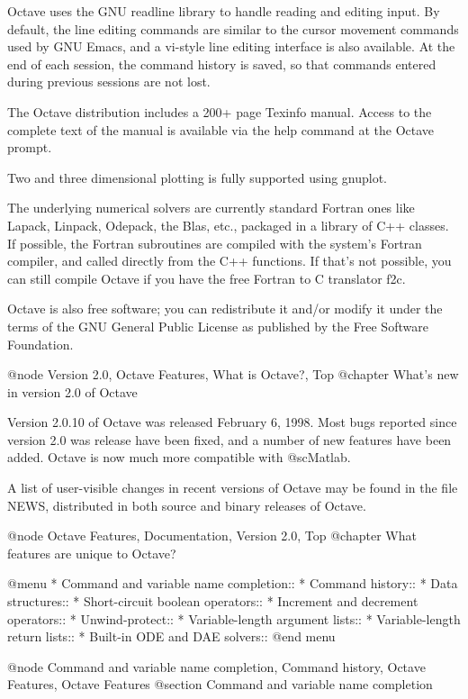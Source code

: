 Octave uses the GNU readline library to handle reading and editing
input.  By default, the line editing commands are similar to the
cursor movement commands used by GNU Emacs, and a vi-style line
editing interface is also available.  At the end of each session, the
command history is saved, so that commands entered during previous
sessions are not lost.

The Octave distribution includes a 200+ page Texinfo manual.  Access
to the complete text of the manual is available via the help command
at the Octave prompt.

Two and three dimensional plotting is fully supported using gnuplot.

The underlying numerical solvers are currently standard Fortran ones
like Lapack, Linpack, Odepack, the Blas, etc., packaged in a library
of C++ classes.  If possible, the Fortran subroutines are compiled
with the system's Fortran compiler, and called directly from the C++
functions.  If that's not possible, you can still compile Octave if
you have the free Fortran to C translator f2c.

Octave is also free software; you can redistribute it and/or modify it
under the terms of the GNU General Public License as published by the
Free Software Foundation.

@node Version 2.0, Octave Features, What is Octave?, Top
@chapter What's new in version 2.0 of Octave

Version 2.0.10 of Octave was released February 6, 1998.  Most bugs
reported since version 2.0 was release have been fixed, and a number of
new features have been added.  Octave is now much more compatible with
@sc{Matlab}.

A list of user-visible changes in recent versions of Octave may be found
in the file NEWS, distributed in both source and binary releases of
Octave.

@node Octave Features, Documentation, Version 2.0, Top
@chapter What features are unique to Octave?

@menu
* Command and variable name completion::  
* Command history::             
* Data structures::             
* Short-circuit boolean operators::  
* Increment and decrement operators::  
* Unwind-protect::              
* Variable-length argument lists::  
* Variable-length return lists::  
* Built-in ODE and DAE solvers::  
@end menu

@node Command and variable name completion, Command history, Octave Features, Octave Features
@section Command and variable name completion

